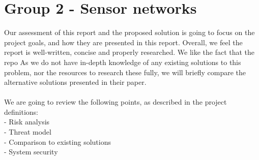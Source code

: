 \section{Group 2 - Sensor networks}

Our assessment of this report and the proposed solution is going to focus on the project goals, and how they are presented in this report.
Overall, we feel the report is well-written, concise and properly researched. We like the fact that the repo
As we do not have in-depth knowledge of any existing solutions to this problem, nor the resources to research these fully, we will briefly compare the alternative solutions presented in their paper.\\

\\We are going to review the following points, as described in the project definitions:
\\- Risk analysis
\\- Threat model
\\- Comparison to existing solutions
\\- System security

